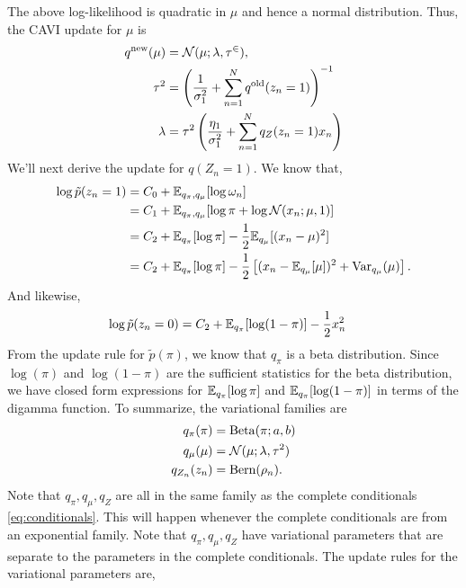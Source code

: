 The above log-likelihood is quadratic in $\mu$ and hence a normal distribution. Thus, the CAVI update for $\mu$ is
\begin{align*}
    q^{\text{new}}(\mu) &=\cal{N}(\mu; \lambda, \tau^2),\\
    \tau^2 &=\left(\frac{1}{\sigma_1^2}+\sum_{n=1}^N q^{\text{old}}(z_n=1)\right)^{-1}\\
    \lambda &= \tau^2\left(\frac{\eta_1}{\sigma_1^2}+\sum_{n=1}^N q_Z(z_n=1)x_n\right)
\end{align*}
We'll next derive the update for $q(Z_n=1)$. We know that,
\begin{align*}
    \log \tilde{p}(z_n=1)&=C_0 + {\mathbb E}_{q_\pi,q_\mu}[\log \omega_n]\\
    &=C_1 +{\mathbb E}_{q_\pi,q_\mu}[\log \pi + \log \mathcal{N}(x_n;\mu,1)]\\
    &=C_2 +{\mathbb E}_{q_\pi}[\log \pi] - \frac{1}{2}{\mathbb E}_{q_\mu}[(x_n-\mu)^2]\\
    &=C_2 + {\mathbb E}_{q_\pi}[\log \pi] -  \frac{1}{2}\left[(x_n-{\mathbb E}_{q_\mu}[\mu])^2 + \mathrm{Var}_{q_\mu}(\mu)\right].
\end{align*}
And likewise,
\begin{align*}
    \log \tilde{p}(z_n=0)&=C_2 + {\mathbb E}_{q_\pi}[\log (1-\pi)] - \frac{1}{2}x_n^2
\end{align*}
From the update rule for $\tilde{p}(\pi)$, we know that $q_\pi$ is a beta distribution. Since $\log(\pi)$ and $\log(1-\pi)$ are the sufficient statistics for the beta distribution, we have closed form expressions for ${\mathbb E}_{q_\pi}[\log \pi]$ and ${\mathbb E}_{q_\pi}[\log (1-\pi)]$ in terms of the digamma function. To summarize, the variational families are
\begin{align*}
    q_\pi(\pi)&=\mathrm{Beta}(\pi;a,b)\\
    q_\mu(\mu)&={\mathcal N}(\mu;\lambda,\tau^2)\\
    q_{Z_n}(z_n)&=\mathrm{Bern}(\rho_n).
\end{align*}
Note that $q_\pi,q_\mu,q_Z$ are all in the same family as the complete conditionals \eqref{eq:conditionals}. This will happen whenever the complete conditionals are from an exponential family. Note that $q_\pi,q_\mu,q_Z$ have variational parameters that are separate to the parameters in the complete conditionals. The update rules for the variational parameters are,
